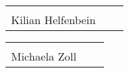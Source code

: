 
\vspace*{1 cm}

\begin{tabular}{p{7cm}p{.5cm}l}
	\dotfill \\ 
	Kilian Helfenbein
\end{tabular}%
\hfill
\begin{tabular}{p{7cm}p{.5cm}l}
	\dotfill \\ 
	Michaela Zoll
\end{tabular}

\newpage
